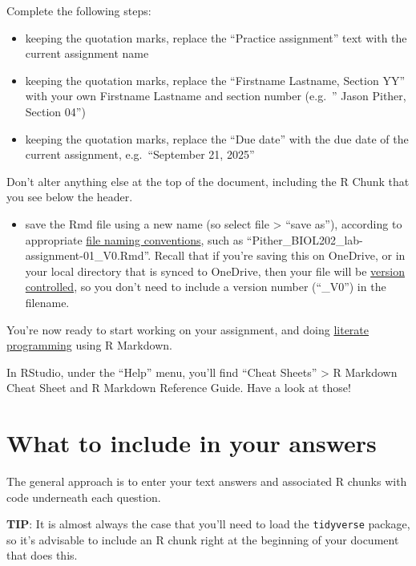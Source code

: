 \documentclass[
]{book}
\providecommand{\tightlist}{%
  \setlength{\itemsep}{0pt}\setlength{\parskip}{0pt}}
\begin{document}
Complete the following steps:

\begin{itemize}
\tightlist
\item
  keeping the quotation marks, replace the ``Practice assignment'' text with the current assignment name\\
\item
  keeping the quotation marks, replace the ``Firstname Lastname, Section YY'' with your own Firstname Lastname and section number (e.g.~'' Jason Pither, Section 04'')
\item
  keeping the quotation marks, replace the ``Due date'' with the due date of the current assignment, e.g.~``September 21, 2025''
\end{itemize}

Don't alter anything else at the top of the document, including the R Chunk that you see below the header.

\begin{itemize}
\tightlist
\item
  save the Rmd file using a new name (so select file \textgreater{} ``save as''), according to appropriate \href{https://ubco-biology.github.io/Procedures-and-Guidelines/file-and-data-management.html}{file naming conventions}, such as ``Pither\_BIOL202\_lab-assignment-01\_V0.Rmd''. Recall that if you're saving this on OneDrive, or in your local directory that is synced to OneDrive, then your file will be \hyperref[onedrive]{version controlled}, so you don't need to include a version number (``\_V0'') in the filename.
\end{itemize}

You're now ready to start working on your assignment, and doing \href{https://ubco-biology.github.io/Procedures-and-Guidelines/glossary.html}{literate programming} using R Markdown.

In RStudio, under the ``Help'' menu, you'll find ``Cheat Sheets'' \textgreater{} R Markdown Cheat Sheet and R Markdown Reference Guide. Have a look at those!

\section{What to include in your answers}\label{what_include_answer}

The general approach is to enter your text answers and associated R chunks with code underneath each question.

\textbf{TIP}: It is almost always the case that you'll need to load the \texttt{tidyverse} package, so it's advisable to include an R chunk right at the beginning of your document that does this.
\end{document}
